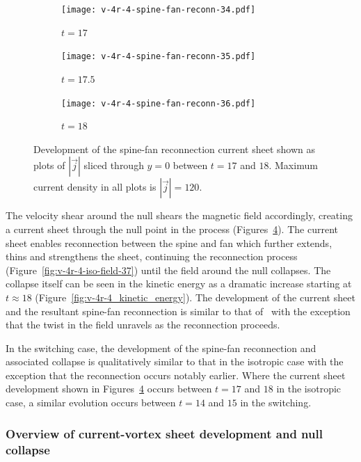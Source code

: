 \begin{figure}[t]
  \centering
    \begin{subfigure}{0.32\textwidth}
      \texttt{[image: v-4r-4-spine-fan-reconn-34.pdf]}
      \caption{$t=17$}
      \label{fig:v-4r-4-spine-fan-reconn-34}
    \end{subfigure}
    \hfill
    \begin{subfigure}{0.32\textwidth}
      \texttt{[image: v-4r-4-spine-fan-reconn-35.pdf]}
      \caption{$t=17.5$}
      \label{fig:v-4r-4-spine-fan-reconn-35}
    \end{subfigure}
    \hfill
    \begin{subfigure}{0.32\textwidth}
      \texttt{[image: v-4r-4-spine-fan-reconn-36.pdf]}
      \caption{$t=18$}
      \label{fig:v-4r-4-spine-fan-reconn-36}
    \end{subfigure}
\caption{Development of the spine-fan reconnection current sheet shown as plots of $|\vec{j}|$ sliced through $y=0$ between $t=17$ and $18$. Maximum current density in all plots is $|\vec{j}| = 120$.}
\label{fig:spine_fan_reconnection_current_sheet}
\end{figure}

The velocity shear around the null shears the magnetic field accordingly, creating a current sheet through the null point in the process (Figures~\ref{fig:spine_fan_reconnection_current_sheet}). The current sheet enables reconnection between the spine and fan which further extends, thins and strengthens the sheet, continuing the reconnection process (Figure~\ref{fig:v-4r-4-iso-field-37}) until the field around the null collapses. The collapse itself can be seen in the kinetic energy as a dramatic increase starting at $t\approx18$ (Figure~\ref{fig:v-4r-4_kinetic_energy}). The development of the current sheet and the resultant spine-fan reconnection is similar to that of~\cite{pontinCurrentSheetFormation2007} with the exception that the twist in the field unravels as the reconnection proceeds. 

In the switching case, the development of the spine-fan reconnection and associated collapse is qualitatively similar to that in the isotropic case with the exception that the reconnection occurs notably earlier. Where the current sheet development shown in Figures~\ref{fig:spine_fan_reconnection_current_sheet} occurs between $t=17$ and $18$ in the isotropic case, a similar evolution occurs between $t=14$ and $15$ in the switching.

\subsubsection{Overview of current-vortex sheet development and null collapse}

